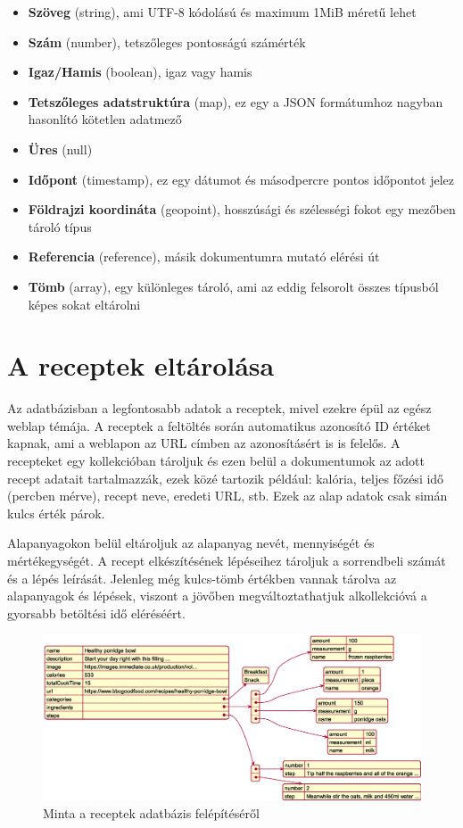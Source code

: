 \documentclass[12pt]{report}
\theoremstyle{definition}
\begin{document}
\begin{itemize}
	\item \textbf{Szöveg} (string), ami UTF-8 kódolású és maximum 1MiB méretű lehet
	\item \textbf{Szám} (number),  tetszőleges pontosságú számérték
	\item \textbf{Igaz/Hamis} (boolean), igaz vagy hamis
	\item \textbf{Tetszőleges adatstruktúra} (map), ez egy a JSON formátumhoz nagyban hasonlító kötetlen adatmező
	\item \textbf{Üres} (null)
	\item \textbf{Időpont} (timestamp), ez egy dátumot és másodpercre pontos időpontot jelez

	\item \textbf{Földrajzi koordináta} (geopoint), hosszúsági és szélességi fokot egy mezőben tároló típus

	\item \textbf{Referencia} (reference), másik dokumentumra mutató elérési út
	\item \textbf{Tömb} (array), egy különleges tároló, ami az eddig felsorolt összes típusból képes sokat eltárolni

\end{itemize}
 

\section{A receptek eltárolása}
Az adatbázisban a legfontosabb adatok a receptek, mivel ezekre épül az egész weblap témája. A receptek a feltöltés során automatikus azonosító ID értéket kapnak, ami a weblapon az URL címben az azonosításért is is felelős. A recepteket egy kollekcióban tároljuk és ezen belül a dokumentumok az adott recept adatait tartalmazzák, ezek közé tartozik például: kalória, teljes főzési idő (percben mérve), recept neve, eredeti URL, stb. Ezek az alap adatok csak simán kulcs érték párok.

Alapanyagokon belül eltároljuk az alapanyag nevét, mennyiségét és mértékegységét. A recept elkészítésének lépéseihez tároljuk a sorrendbeli számát és a lépés leírását. Jelenleg még kulcs-tömb értékben vannak tárolva az alapanyagok és lépések, viszont a jövőben megváltoztathatjuk alkollekcióvá a gyorsabb betöltési idő eléréséért.

\noindent
\begin{figure}[H]
	\centering
	\includegraphics[width=\textwidth]{out/diagrams/jsonRecipes/jsonRecipes.eps}
	\caption{Minta a receptek adatbázis felépítéséről}
    \label{fig:jsonRecipes}
\end{figure}
\end{document}
